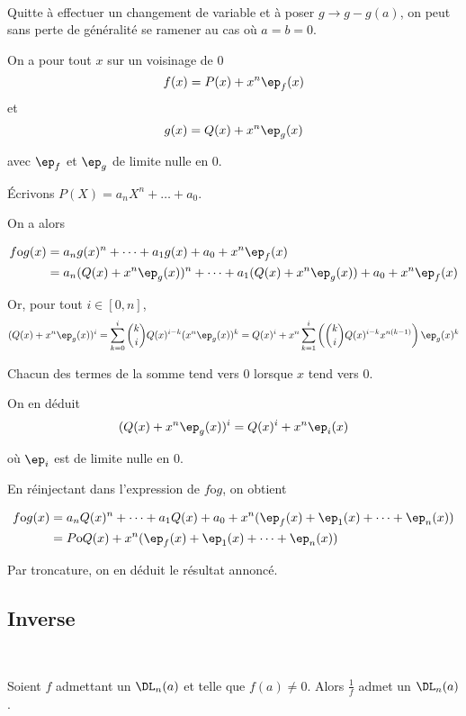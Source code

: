 \documentclass[12pt]{article}
\begin{document}
\begin{demo}~

Quitte à effectuer un changement de variable et à poser $g\rightarrow
g-g(a)$, on peut sans perte de généralité se ramener au cas où $a=b=0$.

On a pour tout $x$ sur un voisinage de $0$ $$f(x)=P(x)+x^n\ep_f(x)$$ et
$$g(x)=Q(x)+x^n\ep_g(x)$$ 

avec $\ep_f$ et $\ep_g$ de limite nulle en 0.

Écrivons $P(X)=a_n X^n + \dots +a_0$.

On a alors

\begin{align*}
f\text{o}g(x)&=a_n g(x)^n+ \dots + a_1 g(x) + a_0 +x^n\ep_f(x)\\
&=a_n (Q(x)+x^n \ep_g(x))^n+ \dots + a_1 (Q(x)+x^n \ep_g(x)) + a_0 +x^n\ep_f(x)
\end{align*}

Or, pour tout $i\in [0,n]$, $$(Q(x)+x^n \ep_g(x))^i=\sum_{k=0}^i
\binom{k}{i}Q(x)^{i-k} (x^n \ep_g(x))^{k}=Q(x)^i + x^n \sum_{k=1}^i
\left(\binom{k}{i}Q(x)^{i-k} x^{n(k-1)}\right) \ep_g(x)^{k} $$

Chacun des termes de la somme tend vers $0$ lorsque $x$ tend vers $0$.

On en déduit $$(Q(x)+x^n \ep_g(x))^i=Q(x)^i+x^n\ep_i(x)$$

où $\ep_i$ est de limite nulle en 0.

En réinjectant dans l'expression de $f\text{o} g$, on obtient

\begin{align*}
f\text{o}g(x)&=a_n Q(x)^n+ \dots + a_1 Q(x) + a_0
+x^n(\ep_f(x)+\ep_1(x)+\dots+\ep_n(x) )\\
&=P\text{o}Q(x)+x^n(\ep_f(x)+\ep_1(x)+\dots+\ep_n(x) )\\
\end{align*}

Par troncature, on en déduit le résultat annoncé.

\end{demo}




\subsection{Inverse}

\begin{Prop}~

Soient $f$ admettant un $\DL_n(a)$ et telle que $f(a)\neq 0$. Alors $\frac{1}{f}$ admet un $\DL_n(a)$. 
\end{Prop}
\end{document}
